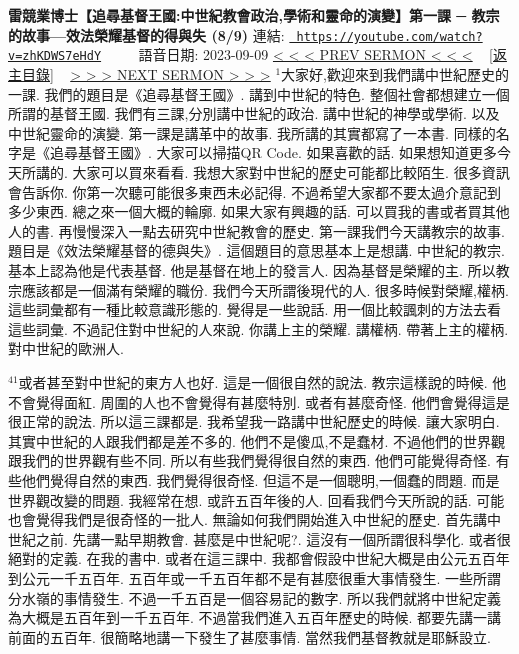 \documentclass{book}
\begin{document}
\section{}
\label{sec:zhKDWS7eHdY}
\textbf{雷競業博士【追尋基督王國:中世紀教會政治,學術和靈命的演變】第一課 ─ 教宗的故事—效法榮耀基督的得與失 (8/9)}
\newline
\newline
連結: \href{https://youtube.com/watch?v=zhKDWS7eHdY}{\texttt{ https://youtube.com/watch?v=zhKDWS7eHdY}} ~~~~ 語音日期: 2023-09-09 
\newline
\newline
\hyperref[sec:hNm147B1MpE]{\small{< < < PREV SERMON < < <}}
~
\hyperref[sec:index]{\small{[返主目錄]}}
~
\hyperref[sec:sTByjA4YMcM]{\small{> > > NEXT SERMON > > >}}
\newline
\newline
$^{1}$大家好,歡迎來到我們講中世紀歷史的一課.
我們的題目是《追尋基督王國》.
講到中世紀的特色.
整個社會都想建立一個所謂的基督王國.
我們有三課,分別講中世紀的政治.
講中世紀的神學或學術.
以及中世紀靈命的演變.
第一課是講革中的故事.
我所講的其實都寫了一本書.
同樣的名字是《追尋基督王國》.
大家可以掃描QR Code.
如果喜歡的話.
如果想知道更多今天所講的.
大家可以買來看看.
我想大家對中世紀的歷史可能都比較陌生.
很多資訊會告訴你.
你第一次聽可能很多東西未必記得.
不過希望大家都不要太過介意記到多少東西.
總之來一個大概的輪廓.
如果大家有興趣的話.
可以買我的書或者買其他人的書.
再慢慢深入一點去研究中世紀教會的歷史.
第一課我們今天講教宗的故事.
題目是《效法榮耀基督的德與失》.
這個題目的意思基本上是想講.
中世紀的教宗.
基本上認為他是代表基督.
他是基督在地上的發言人.
因為基督是榮耀的主.
所以教宗應該都是一個滿有榮耀的職份.
我們今天所謂後現代的人.
很多時候對榮耀,權柄.
這些詞彙都有一種比較意識形態的.
覺得是一些說話.
用一個比較諷刺的方法去看這些詞彙.
不過記住對中世紀的人來說.
你講上主的榮耀.
講權柄.
帶著上主的權柄.
對中世紀的歐洲人.

$^{41}$或者甚至對中世紀的東方人也好.
這是一個很自然的說法.
教宗這樣說的時候.
他不會覺得面紅.
周圍的人也不會覺得有甚麼特別.
或者有甚麼奇怪.
他們會覺得這是很正常的說法.
所以這三課都是.
我希望我一路講中世紀歷史的時候.
讓大家明白.
其實中世紀的人跟我們都是差不多的.
他們不是傻瓜,不是蠢材.
不過他們的世界觀跟我們的世界觀有些不同.
所以有些我們覺得很自然的東西.
他們可能覺得奇怪.
有些他們覺得自然的東西.
我們覺得很奇怪.
但這不是一個聰明,一個蠢的問題.
而是世界觀改變的問題.
我經常在想.
或許五百年後的人.
回看我們今天所說的話.
可能也會覺得我們是很奇怪的一批人.
無論如何我們開始進入中世紀的歷史.
首先講中世紀之前.
先講一點早期教會.
甚麼是中世紀呢?.
這沒有一個所謂很科學化.
或者很絕對的定義.
在我的書中.
或者在這三課中.
我都會假設中世紀大概是由公元五百年到公元一千五百年.
五百年或一千五百年都不是有甚麼很重大事情發生.
一些所謂分水嶺的事情發生.
不過一千五百是一個容易記的數字.
所以我們就將中世紀定義為大概是五百年到一千五百年.
不過當我們進入五百年歷史的時候.
都要先講一講前面的五百年.
很簡略地講一下發生了甚麼事情.
當然我們基督教就是耶穌設立.
\end{document}
